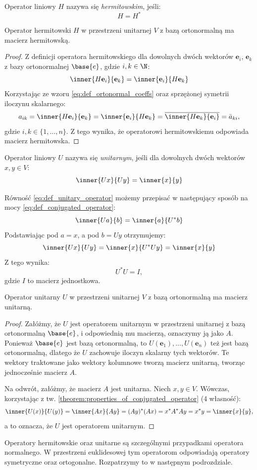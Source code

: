 \begin{definition}\label{def:h_operator}
Operator liniowy $H$ nazywa się \textit{hermitowskim}, jeśli:
$$H = H^*$$
\end{definition}
\begin{theorem}
    Operator hermitowski $H$ w przestrzeni unitarnej $V$ z bazą ortonormalną ma macierz hermitowską.
\end{theorem}
\begin{proof}
    Z definicji operatora hermitowskiego dla dowolnych dwóch wektorów $\textbf{e}_i$, $\textbf{e}_k$ z bazy ortonormalnej $\base{e}$, gdzie $i, k \in \N$:
    $$\inner{H\textbf{e}_i}{\textbf{e}_k} = \inner{\textbf{e}_i}{H\textbf{e}_k}$$
    Korzystając ze wzoru \eqref{eq:def_ortonormal_coeffs} oraz sprzężonej symetrii iloczynu skalarnego:
    $$ a_{ik} = \inner{H\textbf{e}_i}{\textbf{e}_k} = \inner{\textbf{e}_i}{H\textbf{e}_k} = \overline{\inner{H\textbf{e}_k}{\textbf{e}_i}} = \bar{a}_{ki}, $$ gdzie $i, k \in \{1, \dots, n\}$. Z tego wynika, że operatorowi hermitowskiemu odpowiada macierz hermitowska.
\end{proof}

\begin{definition}\label{def:unitary_operator}
    Operator liniowy $U$ nazywa się \textit{unitarnym}, jeśli dla dowolnych dwóch wektorów $x, y \in V$:
    \begin{equation}\label{eq:def_unitary_operator}
        \inner{Ux}{Uy} = \inner{x}{y}
    \end{equation}
\end{definition}
Równość \eqref{eq:def_unitary_operator} możemy przepisać w następujący sposób na mocy \eqref{eq:def_conjugated_operator}:
$$\inner{Ua}{b} = \inner{a}{U^*b}$$
Podstawiając pod $a = x$, a pod $b = Uy$ otrzymujemy:
$$\inner{Ux}{Uy} = \inner{x}{U^*Uy} = \inner{x}{y}$$
Z tego wynika:
\begin{equation}
    U^*U = I,
\end{equation} gdzie $I$ to macierz jednostkowa. 

\begin{theorem}
    Operator unitarny $U$ w przestrzeni unitarnej $V$ z bazą ortonormalną ma macierz unitarną.
\end{theorem}
\begin{proof}
    Załóżmy, że $U$ jest operatorem unitarnym w przestrzeni unitarnej z bazą ortonormalną $\base{e}$, i odpowiednią mu macierzą, oznaczymy ją jako $A$.
    Ponieważ $\base{e}$ jest bazą ortonormalną, to $U(\mathbf{e}_1), \ldots, U(\mathbf{e}_n)$ też jest bazą ortonormalną, dlatego że $U$ zachowuje iloczyn skalarny tych wektorów. Te wektory traktowane jako wektory kolumnowe tworzą macierz unitarną, tworząc jednocześnie macierz $A$.

    Na odwrót, załóżmy, że macierz $A$ jest unitarna. Niech $x, y \in V$. Wówczas, korzystając z tw. \ref{theorem:properties_of_conjugated_operator} (4 własność):
    $$\inner{U(x)}{U(y)} = \inner{Ax}{Ay} = (Ay)^*(Ax) = x^*A^*Ay = x^*y = \inner{x}{y},$$
    a to oznacza, że $U$ jest operatorem unitarnym.
\end{proof}

Operatory hermitowskie oraz unitarne są szczególnymi przypadkami operatora normalnego.
W przestrzeni euklidesowej tym operatorom odpowiadają operatory symetryczne oraz ortogonalne. Rozpatrzymy to w następnym podrozdziale.
